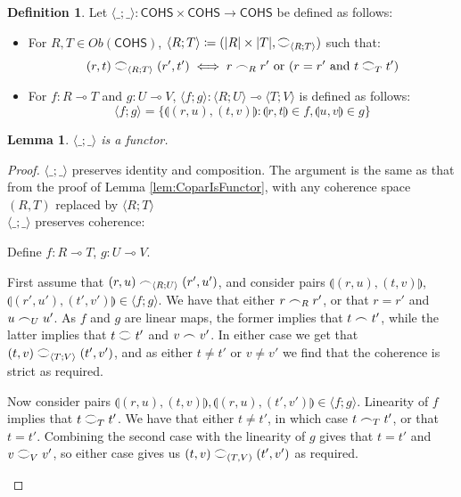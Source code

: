 \documentclass[12pt, oneside]{article}
\theoremstyle{plain}
\newtheorem{lemma}[theorem]{Lemma}
\theoremstyle{definition}
\newtheorem{definition}[theorem]{Definition}
\newcommand{\la}{\langle}
\newcommand{\ra}{\rangle}
\newcommand{\lp}{\llparenthesis}
\newcommand{\rp}{\rrparenthesis}
\newcommand{\cohs}{{\mathsf{COHS}}}
\newcommand{\coh}[1][]{\mathrel{\vcenter{\offinterlineskip\hbox{$\frown$}\vskip0.2ex\hbox{$\smile$}}_{\ifx\\#1\\\else#1\fi}}}
\newcommand{\scoh}[1][]{\mathrel{\frown}_{\ifx\\#1\\\else#1\fi}}
\begin{document}
\begin{definition}
    Let $\la\_;\_\ra:\cohs\times\cohs\to\cohs$ be defined as follows:
    \begin{itemize}
        \item
        For $R,T\in Ob(\cohs)$, $\la R;T\ra\coloneqq(|R|\times|T|,\coh[\la R;T\ra])$ such that:
        $$(r,t)\coh[\la R;T\ra](r',t') \iff r\scoh[R]r'\text{ or }(r=r'\text{ and }t\coh[T]t')$$

        \item
        For $f:R\multimap T$ and $g:U\multimap V$, 
        $\la f;g\ra:\la R;U\ra\multimap\la T;V\ra$ is defined as follows:
        $$\la f;g\ra=\{\lp(r,u),(t,v)\rp:\lp r,t\rp\in f,\lp u,v\rp\in g\}$$
    \end{itemize}
\end{definition}

\begin{lemma}
    $\la\_;\_\ra$ is a functor.
\end{lemma}

\begin{proof}
    $\la\_;\_\ra$ preserves identity and composition.
    The argument is the same as that from the proof of Lemma \ref{lem:CoparIsFunctor}, with any coherence space $(R,T)$ replaced by $\la R;T\ra$\\

    $\la\_;\_\ra$ preserves coherence:

    \begin{adjustwidth}{1.5em}{}
        Define $f : R\multimap T$, $g : U\multimap V$.

        First assume that $(r,u)\scoh[\la R;U\ra](r',u')$, and consider pairs $\lp(r,u),(t,v)\rp$, $\lp(r',u'),(t',v')\rp\in \la f;g\ra$. 
        We have that either $r\scoh[R]r'$, or that $r=r'$ and $u\scoh[U]u'$.
        As $f$ and $g$ are linear maps, the former implies that $t\scoh t'$, while the latter implies that $t\coh t'$ and $v\scoh v'$.
        In either case we get that $(t,v)\coh[\la T;V\ra](t',v')$, and as either $t\neq t'$ or $v\neq v'$ we find that the coherence is strict as required.

        Now consider pairs $\lp(r,u),(t,v)\rp,\lp(r,u),(t',v')\rp\in\la f;g\ra$.
        Linearity of $f$ implies that $t\coh[T]t'$.
        We have that either $t\neq t'$, in which case $t\scoh[T]t'$, or that $t=t'$.
        Combining the second case with the linearity of $g$ gives that $t=t'$ and $v\coh[V]v'$, so either case gives us $(t,v)\coh[(T,V)](t',v')$ as required.
    \end{adjustwidth}
\end{proof}
\end{document}
